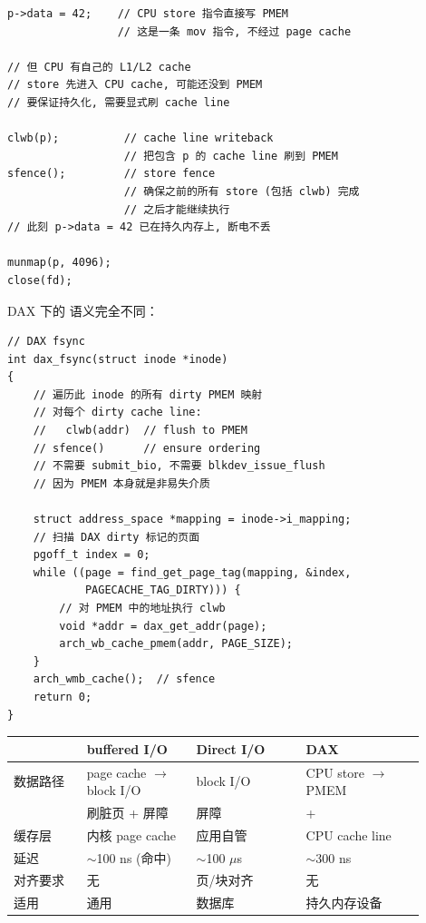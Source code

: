 \begin{filesystemlayout}
\begin{lstlisting}
p->data = 42;    // CPU store 指令直接写 PMEM
                 // 这是一条 mov 指令, 不经过 page cache

// 但 CPU 有自己的 L1/L2 cache
// store 先进入 CPU cache, 可能还没到 PMEM
// 要保证持久化, 需要显式刷 cache line

clwb(p);          // cache line writeback
                  // 把包含 p 的 cache line 刷到 PMEM
sfence();         // store fence
                  // 确保之前的所有 store (包括 clwb) 完成
                  // 之后才能继续执行
// 此刻 p->data = 42 已在持久内存上, 断电不丢

munmap(p, 4096);
close(fd);
\end{lstlisting}

DAX 下的  语义完全不同：

\begin{lstlisting}
// DAX fsync
int dax_fsync(struct inode *inode)
{
    // 遍历此 inode 的所有 dirty PMEM 映射
    // 对每个 dirty cache line:
    //   clwb(addr)  // flush to PMEM
    // sfence()      // ensure ordering
    // 不需要 submit_bio, 不需要 blkdev_issue_flush
    // 因为 PMEM 本身就是非易失介质

    struct address_space *mapping = inode->i_mapping;
    // 扫描 DAX dirty 标记的页面
    pgoff_t index = 0;
    while ((page = find_get_page_tag(mapping, &index,
            PAGECACHE_TAG_DIRTY))) {
        // 对 PMEM 中的地址执行 clwb
        void *addr = dax_get_addr(page);
        arch_wb_cache_pmem(addr, PAGE_SIZE);
    }
    arch_wmb_cache();  // sfence
    return 0;
}
\end{lstlisting}

\begin{longtable}{|F{0.16\linewidth}|F{0.24\linewidth}|F{0.24\linewidth}|F{0.26\linewidth}|}
\toprule
{}
& buffered I/O & Direct I/O & DAX \\
\midrule
数据路径 & page cache $\to$ block I/O & block I/O & CPU store $\to$ PMEM \\\tablerowrule
{} & 刷脏页 + 屏障 & 屏障 &  +  \\\tablerowrule
缓存层 & 内核 page cache & 应用自管 & CPU cache line \\\tablerowrule
延迟 & $\sim$100 ns (命中) & $\sim$100 $\mu$s & $\sim$300 ns \\\tablerowrule
对齐要求 & 无 & 页/块对齐 & 无 \\\tablerowrule
适用 & 通用 & 数据库 & 持久内存设备 \\
\bottomrule
\end{longtable}


\end{filesystemlayout}
